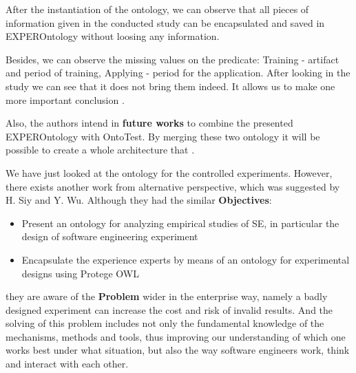 	 After the instantiation of the ontology, we can observe that all pieces of information given in the conducted study can be encapsulated and saved in EXPEROntology without loosing any information.
	 
	 Besides, we can observe the missing values on the predicate: Training - artifact and period of training, Applying - period for the application. After looking in the study we can see that it does not bring them indeed. It allows us to make one more important conclusion \frqq\cite{Gar08}. 
	 
	 Also, the authors intend in \textbf{future works} to combine the presented EXPEROntology with OntoTest. By merging these two ontology it will be possible to create a whole architecture that \frqq\cite[p.6]{Gar08}.
	 
	 We have just looked at the ontology for the controlled experiments. However, there exists another work from alternative perspective, which was suggested by H. Siy and Y. Wu\cite{SiyWu12}. Although they had the similar \textbf{Objectives}:
	  \begin{itemize}
	 	\item Present an ontology for analyzing empirical studies of SE, in particular the design of software engineering experiment
	 	\item Encapsulate the experience experts by means of an ontology for experimental designs using Protege OWL
	 \end{itemize}
	they are aware of the \textbf{Problem} wider in the enterprise way, namely a badly designed experiment can increase the cost and risk of invalid results. And the solving of this problem includes not only the fundamental knowledge of the mechanisms, methods and tools, thus improving our understanding of which one works best under what situation, but also the way software engineers work, think and interact with each other.
	
